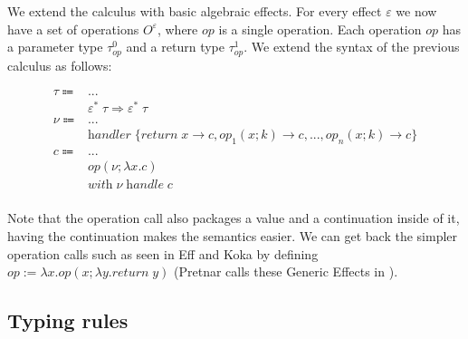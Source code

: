 \documentclass[12pt]{article}
\newcommand\eff[0]{\varepsilon}
\newcommand\effs[0]{\eff^*}
\newcommand\eop[0]{\textit{op}}
\newcommand\eops[1]{O^{#1}}
\newcommand\type[0]{\tau}
\newcommand\thandler[4]{#1 \; #2 \Rightarrow #3 \; #4}
\newcommand\val[0]{\nu}
\newcommand\vabs[2]{\lambda #1 . #2}
\newcommand\vhandler[1]{\textit{handler} \; \{#1\}}
\newcommand\vhandlerc[0]{\vhandler{
	\textit{return} \; x \rightarrow \comp,
	\eop_1(x ; k) \rightarrow \comp,
	...,
	\eop_n(x ; k) \rightarrow \comp
}}
\newcommand\comp[0]{c}
\newcommand\creturn[1]{\textit{return} \; #1}
\newcommand\cop[4]{#1(#2 ; \lambda #3 . #4)}
\newcommand\chandle[2]{\textit{with} \; #1 \; \textit{handle} \; #2}
\begin{document}
We extend the calculus with basic algebraic effects. For every effect $\eff$ we now have a set of operations $\eops{\eff}$, where $\eop$ is a single operation. Each operation $\eop$ has a parameter type $\type^0_\eop$ and a return type $\type^1_\eop$. We extend the syntax of the previous calculus as follows:

\begin{align*}
	\type \Coloneqq 	& ...							\tag{types} \\
				& \thandler{\effs}{\type}{\effs}{\type}	\tag{type of handlers} \\
	\val \Coloneqq	& ...							\tag{values} \\
				& \vhandlerc						\tag{handler} \\
	\comp \Coloneqq	& ...							\tag{computations} \\
				& \cop{\eop}{\val}{x}{\comp}			\tag{operation call} \\
				& \chandle{\val}{\comp}				\tag{handle computation} \\
\end{align*}

Note that the operation call also packages a value and a continuation inside of it, having the continuation makes the semantics easier.
We can get back the simpler operation calls such as seen in Eff and Koka by defining $\eop := \vabs{x}{\cop{\eop}{x}{y}{\creturn{y}}}$ (Pretnar calls these Generic Effects in \cite{pretnar}).

\subsection{Typing rules}
\end{document}
